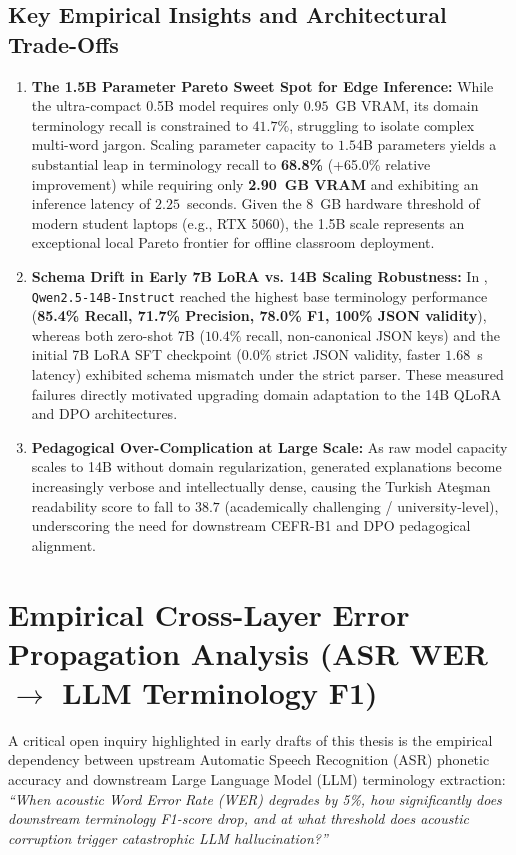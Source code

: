 \documentclass[a4paper,12pt]{report}
\begin{document}
\subsection{Key Empirical Insights and Architectural Trade-Offs}
\begin{enumerate}
    \item \textbf{The 1.5B Parameter Pareto Sweet Spot for Edge Inference:}  
    While the ultra-compact 0.5B model requires only $0.95$~GB VRAM, its domain terminology recall is constrained to $41.7\%$, struggling to isolate complex multi-word jargon. Scaling parameter capacity to $1.54$B parameters yields a substantial leap in terminology recall to \textbf{68.8\%} (+65.0\% relative improvement) while requiring only \textbf{2.90~GB VRAM} and exhibiting an inference latency of $2.25$~seconds. Given the 8~GB hardware threshold of modern student laptops (e.g., RTX 5060), the 1.5B scale represents an exceptional local Pareto frontier for offline classroom deployment.

    \item \textbf{Schema Drift in Early 7B LoRA vs. 14B Scaling Robustness:}  
    In , \texttt{Qwen2.5-14B-Instruct} reached the highest base terminology performance (\textbf{85.4\% Recall, 71.7\% Precision, 78.0\% F1, 100\% JSON validity}), whereas both zero-shot 7B ($10.4\%$ recall, non-canonical JSON keys) and the initial 7B LoRA SFT checkpoint ($0.0\%$ strict JSON validity, faster $1.68$~s latency) exhibited schema mismatch under the strict parser. These measured failures directly motivated upgrading domain adaptation to the 14B QLoRA and DPO architectures.

    \item \textbf{Pedagogical Over-Complication at Large Scale:}  
    As raw model capacity scales to 14B without domain regularization, generated explanations become increasingly verbose and intellectually dense, causing the Turkish Ate\c{s}man readability score to fall to $38.7$ (academically challenging / university-level), underscoring the need for downstream CEFR-B1 and DPO pedagogical alignment.
\end{enumerate}

\section{Empirical Cross-Layer Error Propagation Analysis (ASR WER \texorpdfstring{$\to$}{->} LLM Terminology F1)}
A critical open inquiry highlighted in early drafts of this thesis is the empirical dependency between upstream Automatic Speech Recognition (ASR) phonetic accuracy and downstream Large Language Model (LLM) terminology extraction: \emph{``When acoustic Word Error Rate (WER) degrades by 5\%, how significantly does downstream terminology F1-score drop, and at what threshold does acoustic corruption trigger catastrophic LLM hallucination?''}
\end{document}
